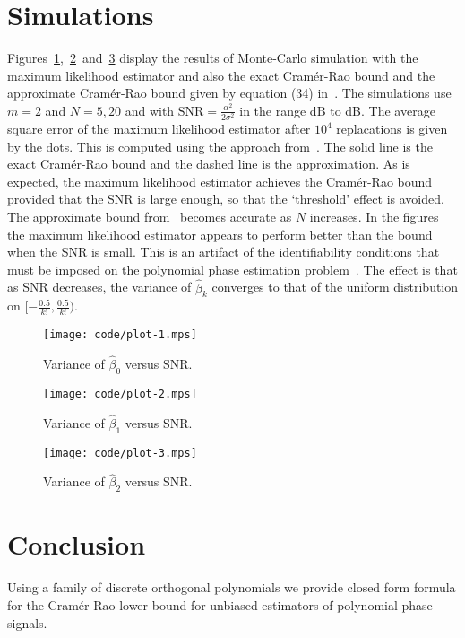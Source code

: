\documentclass[journal,10pt]{IEEEtran}
\begin{document}
\section{Simulations}\label{sec:simuations}

Figures~\ref{plot:phase0},~\ref{plot:phase1}~and~\ref{plot:phase2} display the results of Monte-Carlo simulation with the maximum likelihood estimator and also the exact Cram\'{e}r-Rao bound and the approximate Cram\'{e}r-Rao bound given by equation (34) in~\cite{Peleg1991_CRB_PPS_1991}.  The simulations use $m=2$ and $N=5,20$ and with $\text{SNR} = \tfrac{\alpha^2}{2\sigma^2}$ in the range \unit[-5]{dB} to \unit[25]{dB}.   The average square error of the maximum likelihood estimator after $10^4$ replacations is given by the dots.  This is computed using the approach from~\cite[Sec.~10.1]{McKilliam2010thesis}.  The solid line is the exact Cram\'{e}r-Rao bound and the dashed line is the approximation.  As is expected, the maximum likelihood estimator achieves the Cram\'{e}r-Rao bound provided that the SNR is large enough, so that the `threshold' effect is avoided.  The approximate bound from~\cite{Peleg1991_CRB_PPS_1991} becomes accurate as $N$ increases.  In the figures the maximum likelihood estimator appears to perform better than the bound when the SNR is small.  This is an artifact of the identifiability conditions that must be imposed on the polynomial phase estimation problem~\cite[Ch.~7]{McKilliam2010thesis}\cite{McKilliam2009IndentifiabliltyAliasingPolyphase}.  The effect is that as SNR decreases, the variance of $\hat{\beta}_k$ converges to that of the uniform distribution on $[-\tfrac{0.5}{k!},\tfrac{0.5}{k!})$.

\begin{figure}[p]
   	\centering 
  		\texttt{[image: code/plot-1.mps]} 
   		\caption{Variance of $\hat{\beta}_0$ versus SNR.} 
   		\label{plot:phase0} 
  \end{figure} 

\begin{figure}[p]
   	\centering 
  		\texttt{[image: code/plot-2.mps]} 
   		\caption{Variance of $\hat{\beta}_1$ versus SNR.} 
   		\label{plot:phase1} 
  \end{figure} 

\begin{figure}[p]
   	\centering 
  		\texttt{[image: code/plot-3.mps]} 
   		\caption{Variance of $\hat{\beta}_2$ versus SNR.} 
   		\label{plot:phase2} 
  \end{figure} 
 
\section{Conclusion}

Using a family of discrete orthogonal polynomials we provide closed form formula for the Cram\'{e}r-Rao lower bound for unbiased estimators of polynomial phase signals.


%
\small 

 
 
\end{document}
